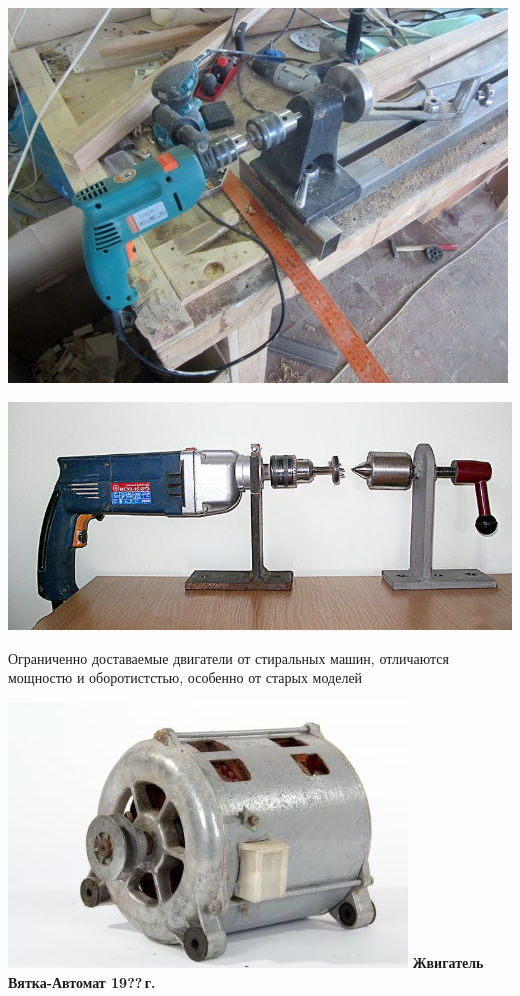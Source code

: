 \documentclass{magazine}
\begin{document}
{\noindent\includegraphics[width=\columnwidth]{fig/00/DrelLathe.jpg}

\noindent\includegraphics[width=\columnwidth]{fig/00/DrelLathe2.jpg}

\bigskip
Ограниченно доставаемые двигатели от стиральных машин, отличаются
  мощностю и оборотистстью, особенно от старых моделей
  
\noindent\includegraphics[width=\columnwidth]{fig/00/VyatkaDvig.jpg}
\textbf{Жвигатель Вятка-Автомат 19??\,г.}
  
}
\end{document}
